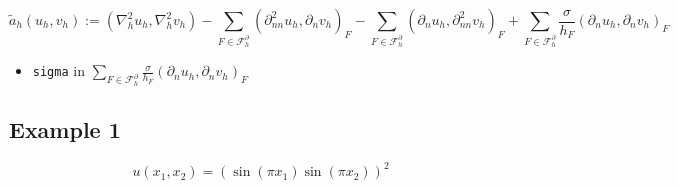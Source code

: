 \documentclass[11pt]{article}
\providecommand{\tightlist}{%
      \setlength{\itemsep}{0pt}\setlength{\parskip}{0pt}}
\begin{document}
\[
\tilde{a}_{h}\left(u_{h}, v_{h}\right):=\left(\nabla_{h}^{2} u_{h}, \nabla_{h}^{2} v_{h}\right)-\sum_{F \in \mathcal{F}_{h}^{\partial}}\left(\partial_{n n}^{2} u_{h}, \partial_{n} v_{h}\right)_{F}-\sum_{F \in \mathcal{F}_{h}^{\partial}}\left(\partial_{n} u_{h}, \partial_{n n}^{2} v_{h}\right)_{F}+\sum_{F \in \mathcal{F}_{h}^{\partial}} \frac{\sigma}{h_{F}}\left(\partial_{n} u_{h}, \partial_{n} v_{h}\right)_{F}
\]

    \begin{itemize}
\tightlist
\item
  \texttt{sigma} in
  \(\sum_{F \in \mathcal{F}_{h}^{\partial}} \frac{\sigma}{h_{F}}\left(\partial_{n} u_{h}, \partial_{n} v_{h}\right)_{F}\)
\end{itemize}

    \subsection{Example 1}\label{example-1}

\[
u\left(x_{1}, x_{2}\right)=\left(\sin \left(\pi x_{1}\right) \sin \left(\pi x_{2}\right)\right)^{2}
\]
\end{document}
